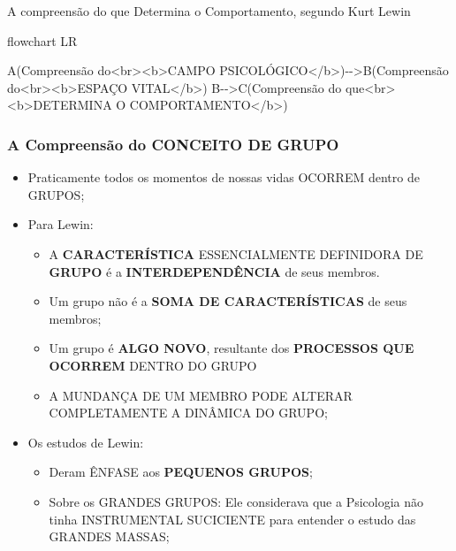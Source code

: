 \documentclass[
]{book}
\newenvironment{Shaded}{\begin{snugshade}}{\end{snugshade}}
\newcommand{\NormalTok}[1]{#1}
\providecommand{\tightlist}{%
  \setlength{\itemsep}{0pt}\setlength{\parskip}{0pt}}
\begin{document}
A compreensão do que Determina o Comportamento, segundo Kurt Lewin

\begin{Shaded}
\begin{Highlighting}[]
\NormalTok{flowchart LR}

\NormalTok{A(Compreensão do\textless{}br\textgreater{}\textless{}b\textgreater{}CAMPO PSICOLÓGICO\textless{}/b\textgreater{}){-}{-}\textgreater{}B(Compreensão do\textless{}br\textgreater{}\textless{}b\textgreater{}ESPAÇO VITAL\textless{}/b\textgreater{})}
\NormalTok{B{-}{-}\textgreater{}C(Compreensão do que\textless{}br\textgreater{}\textless{}b\textgreater{}DETERMINA O COMPORTAMENTO\textless{}/b\textgreater{})}
\end{Highlighting}
\end{Shaded}

\hypertarget{a-compreensuxe3o-do-conceito-de-grupo}{%
\subsubsection{A Compreensão do CONCEITO DE GRUPO}\label{a-compreensuxe3o-do-conceito-de-grupo}}

\begin{itemize}
\tightlist
\item
  Praticamente todos os momentos de nossas vidas OCORREM dentro de GRUPOS;
\item
  Para Lewin:

  \begin{itemize}
  \tightlist
  \item
    A \textbf{CARACTERÍSTICA} ESSENCIALMENTE DEFINIDORA DE \textbf{GRUPO } é a \textbf{INTERDEPENDÊNCIA} de seus membros.
  \item
    Um grupo não é a \textbf{SOMA DE CARACTERÍSTICAS} de seus membros;
  \item
    Um grupo é \textbf{ALGO NOVO}, resultante dos \textbf{PROCESSOS QUE OCORREM} DENTRO DO GRUPO
  \item
    A MUNDANÇA DE UM MEMBRO PODE ALTERAR COMPLETAMENTE A DINÂMICA DO GRUPO;
  \end{itemize}
\item
  Os estudos de Lewin:

  \begin{itemize}
  \tightlist
  \item
    Deram ÊNFASE aos \textbf{PEQUENOS GRUPOS};
  \item
    Sobre os GRANDES GRUPOS: Ele considerava que a Psicologia não tinha INSTRUMENTAL SUCICIENTE para entender o estudo das GRANDES MASSAS;
  \end{itemize}
\end{itemize}
\end{document}
